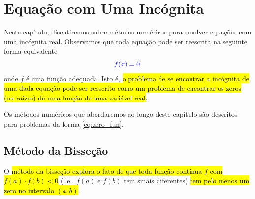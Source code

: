 

\chapter{Equação com Uma Incógnita}\label{cap_eq1d}

Neste capítulo, discutiremos sobre métodos numéricos para resolver equações com uma incógnita real. Observamos que toda equação pode ser reescrita na seguinte forma equivalente
\begin{equation}\label{eq:zero_fun}
  {\color{blue}f(x) = 0},
\end{equation}
onde $f$ é uma função adequada. Isto é, \hl{o problema de se encontrar a incógnita de uma dada equação pode ser reescrito como um problema de encontrar os zeros (ou raízes) de uma função de uma variável real}.

Os métodos numéricos que abordaremos ao longo deste capítulo são descritos para problemas da forma \eqref{eq:zero_fun}.

\section{Método da Bisseção}\label{cap_eq1d_sec_bissec}

O \hl{método da bisseção explora o fato de que toda função contínua $f$ com $f(a)\cdot f(b) < 0$} (i.e., $f(a)$ e $f(b)$ tem sinais diferentes) \hl{tem pelo menos um zero no intervalo $(a, b)$}.

